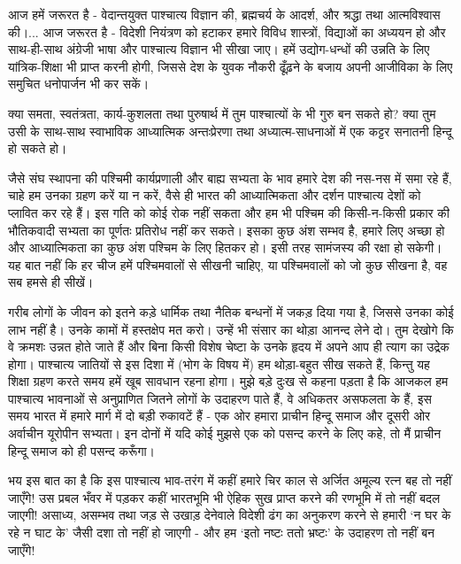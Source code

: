 आज हमें जरूरत है - वेदान्तयुक्त पाश्चात्य विज्ञान की, ब्रह्मचर्य के आदर्श, और श्रद्धा तथा आत्मविश्वास की।... आज जरूरत है - विदेशी नियंत्रण को हटाकर हमारे विविध शास्त्रों, विद्याओं का अध्ययन हो और साथ-ही-साथ अंग्रेजी भाषा और पाश्चात्य विज्ञान भी सीखा जाए। हमें उद्योग-धन्धों की उन्नति के लिए यांत्रिक-शिक्षा भी प्राप्त करनी होगी, जिससे देश के युवक नौकरी ढूँढ़ने के बजाय अपनी आजीविका के लिए समुचित धनोपार्जन भी कर सकें। 

क्या समता, स्वतंत्रता, कार्य-कुशलता तथा पुरुषार्थ में तुम पाश्चात्यों के भी गुरु बन सकते हो? क्या तुम उसी के साथ-साथ स्वाभाविक आध्यात्मिक अन्तःप्रेरणा तथा अध्यात्म-साधनाओं में एक कट्टर सनातनी हिन्दू हो सकते हो। 

जैसे संघ स्थापना की पश्चिमी कार्यप्रणाली और बाह्य सभ्यता के भाव हमारे देश की नस-नस में समा रहे हैं, चाहे हम उनका ग्रहण करें या न करें, वैसे ही भारत की आध्यात्मिकता और दर्शन पाश्चात्य देशों को प्लावित कर रहे हैं। इस गति को कोई रोक नहीं सकता और हम भी पश्चिम की किसी-न-किसी प्रकार की भौतिकवादी सभ्यता का पूर्णतः प्रतिरोध नहीं कर सकते। इसका कुछ अंश सम्भव है, हमारे लिए अच्छा हो और आध्यात्मिकता का कुछ अंश पश्चिम के लिए हितकर हो। इसी तरह सामंजस्य की रक्षा हो सकेगी। यह बात नहीं कि हर चीज हमें पश्चिमवालों से सीखनी चाहिए, या पश्चिमवालों को जो कुछ सीखना है, वह सब हमसे ही सीखें। 

गरीब लोगों के जीवन को इतने कड़े धार्मिक तथा नैतिक बन्धनों में जकड़ दिया गया है, जिससे उनका कोई लाभ नहीं है। उनके कामों में हस्तक्षेप मत करो। उन्हें भी संसार का थोड़ा आनन्द लेने दो। तुम देखोगे कि वे क्रमशः उन्नत होते जाते हैं और बिना किसी विशेष चेष्टा के उनके हृदय में अपने आप ही त्याग का उद्रेक होगा। पाश्चात्य जातियों से इस दिशा में (भोग के विषय में) हम थोड़ा-बहुत सीख सकते हैं, किन्तु यह शिक्षा ग्रहण करते समय हमें खूब सावधान रहना होगा। मुझे बड़े दुःख से कहना पड़ता है कि आजकल हम पाश्चात्य भावनाओं से अनुप्राणित जितने लोगों के उदाहरण पाते हैं, वे अधिकतर असफलता के हैं, इस समय भारत में हमारे मार्ग में दो बड़ी रुकावटें हैं - एक ओर हमारा प्राचीन हिन्दू समाज और दूसरी ओर अर्वाचीन यूरोपीन सभ्यता। इन दोनों में यदि कोई मुझसे एक को पसन्द करने के लिए कहे, तो मैं प्राचीन हिन्दू समाज को ही पसन्द करूँगा। 

भय इस बात का है कि इस पाश्चात्य भाव-तरंग में कहीं हमारे चिर काल से अर्जित अमूल्य रत्न बह तो नहीं जाएँगे! उस प्रबल भँवर में पड़कर कहीं भारतभूमि भी ऐहिक सुख प्राप्त करने की रणभूमि में तो नहीं बदल जाएगी! असाध्य, असम्भव तथा जड़ से उखाड़ देनेवाले विदेशी ढंग का अनुकरण करने से हमारी ‘न घर के रहे न घाट के’ जैसी दशा तो नहीं हो जाएगी - और हम ‘इतो नष्टः ततो भ्रष्टः’ के उदाहरण तो नहीं बन जाएँगे! 

